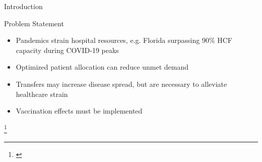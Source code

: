 \documentclass[aspectratio=169,xcolor=dvipsnames]{beamer}
\begin{document}
\begin{frame}{Introduction}
\begin{minipage}[t]{0.48\textwidth}
\begin{figure}
        \end{figure}
    \end{minipage}
    \hfill
    \begin{minipage}[t]{0.48\textwidth}
        \begin{block}{Problem Statement}
            \begin{itemize}
                \item Pandemics strain hospital resources, e.g. Florida surpassing 90\% HCF capacity during COVID-19 peaks 
                \item Optimized patient allocation can reduce unmet demand  
                \item Transfers may increase disease spread, but are necessary to alleviate healthcare strain  
                \item Vaccination effects must be implemented
            \end{itemize}           
        \end{block}
    \end{minipage}
    \footnote{\cite{lauer2020incubation} \cite{FloridaHospitalAssociation2021} \cite{CDCCOVIDDataTracker2025}}
\end{frame}
\end{document}
